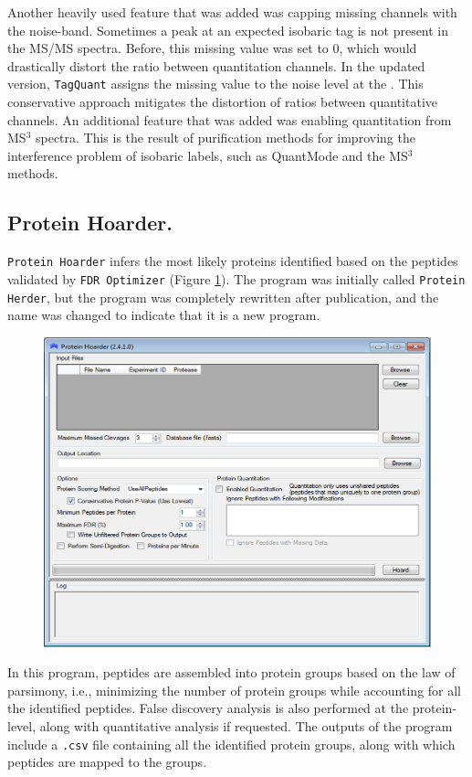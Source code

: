 Another heavily used feature that was added was capping missing channels with the noise-band. Sometimes a peak at an expected isobaric tag \mz{} is not present in the MS/MS spectra. Before, this missing value was set to $0$, which would drastically distort the ratio between quantitation channels. In the updated version, \texttt{TagQuant} assigns the missing value to the noise level at the \mz{}. This conservative approach mitigates the distortion of ratios between quantitative channels. An additional feature that was added was enabling quantitation from MS$^3$ spectra. This is the result of purification methods for improving the interference problem of isobaric labels, such as QuantMode and the MS$^3$ methods.\cite{quantmode,ms3}

\subsection*{Protein Hoarder.}
\texttt{Protein Hoarder} infers the most likely proteins identified based on the peptides validated by \texttt{FDR Optimizer} (Figure \ref{fig:hoarder}). The program was initially called \texttt{Protein Herder}, but the program was completely rewritten after publication, and the name was changed to indicate that it is a new program.
\begin{figure}[p]
	\centering
	\includegraphics[width=\columnwidth]{csmsl/proteinhoarder.png}
	\label{fig:hoarder}
\end{figure}
In this program, peptides are assembled into protein groups based on the law of parsimony, i.e., minimizing the number of protein groups while accounting for all the identified peptides. False discovery analysis is also performed at the protein-level, along with quantitative analysis if requested. The outputs of the program include a \texttt{.csv} file containing all the identified protein groups, along with which peptides are mapped to the groups.

